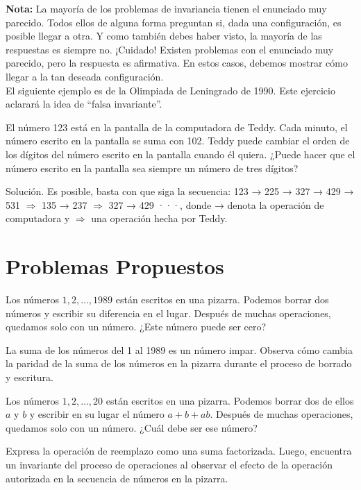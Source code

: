 \documentclass[11pt]{scrartcl}
\begin{document}
\textbf{Nota:} La mayoría de los problemas de invariancia tienen el enunciado muy parecido. Todos ellos de alguna forma preguntan si, dada una configuración, es posible llegar a otra. Y como también debes haber visto, la mayoría de las respuestas es siempre no. ¡Cuidado! Existen problemas con el enunciado muy parecido, pero la respuesta es afirmativa. En estos casos, debemos mostrar cómo llegar a la tan deseada configuración.\\

El siguiente ejemplo es de la Olimpiada de Leningrado de 1990. Este ejercicio aclarará la idea de ``falsa invariante''.

\begin{example}
    El número 123 está en la pantalla de la computadora de Teddy. Cada minuto, el número escrito en la pantalla se suma con 102. Teddy puede cambiar el orden de los dígitos del número escrito en la pantalla cuando él quiera. ¿Puede hacer que el número escrito en la pantalla sea siempre un número de tres dígitos?
\end{example}
Solución. Es posible, basta con que siga la secuencia: 123 → 225 → 327 → 429 → 531 \(\Rightarrow\) 135 → 237 \(\Rightarrow\) 327 → 429 ···, donde → denota la operación de computadora y \(\Rightarrow\) una operación hecha por Teddy.


\section{Problemas Propuestos}

\begin{problem}
Los números \(1, 2, \ldots, 1989\) están escritos en una pizarra. Podemos borrar dos números y escribir su diferencia en el lugar. Después de muchas operaciones, quedamos solo con un número. ¿Este número puede ser cero?
\begin{hint}
    La suma de los números del 1 al 1989 es un número impar. Observa cómo cambia la paridad de la suma de los números en la pizarra durante el proceso de borrado y escritura.
\end{hint}
\end{problem}

\begin{problem}
Los números \(1, 2, \ldots, 20\) están escritos en una pizarra. Podemos borrar dos de ellos \(a\) y \(b\) y escribir en su lugar el número \(a + b + ab\). Después de muchas operaciones, quedamos solo con un número. ¿Cuál debe ser ese número?
\begin{hint}
    Expresa la operación de reemplazo como una suma factorizada. Luego, encuentra un invariante del proceso de operaciones al observar el efecto de la operación autorizada en la secuencia de números en la pizarra.
\end{hint}
\end{problem}
\end{document}
